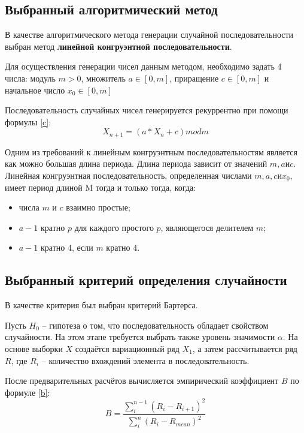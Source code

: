 \subsection*{Выбранный алгоритмический метод}
В качестве алгоритмического метода генерации случайной последовательности выбран метод \textbf{линейной конгруэнтной последовательности}.

Для осуществления генерации чисел данным методом, необходимо задать 4 числа: модуль $m > 0$, множитель $a \in [0, m]$, приращение $c \in [0, m]$ и начальное число $x_0 \in [0, m]$ 

Последовательность случайных чисел генерируется рекуррентно при помощи формулы \ref{c}:
\begin{equation}
	\label{c}
	X_{n + 1} = (a * X_n + c) mod m
\end{equation}

Одним из требований к линейным конгруэнтным последовательностям является как можно большая длина периода. Длина периода зависит от значений $m, a и c$. 
Линейная конгруэнтная последовательность, определенная числами $m, a, c и x_0$, имеет период длиной M тогда и только тогда, когда:
\begin{itemize}
	\item числа $m$ и $c$ взаимно простые;
	\item $a-1$ кратно $p$ для каждого простого $p$, являющегося делителем $m$;
	\item $a-1$ кратно 4, если $m$ кратно 4.
\end{itemize}




\subsection*{Выбранный критерий определения случайности}
В качестве критерия был выбран критерий Бартерса.

Пусть $H_0$ -- гипотеза о том, что последовательность обладает свойством случайности. На этом этапе требуется выбрать также уровень значимости $\alpha$.
На основе выборки $X$ создаётся вариационный ряд $X_1$, а затем рассчитывается ряд $R$, где $R_i$ -- количество вхождений элемента в последовательность.

После предварительных расчётов вычисляется эмпирический коэффициент $B$ по формуле \ref{b}:
\begin{equation}
	\label{b}
	B = \frac{\sum_{i}^{n - 1} (R_i - R_{i + 1})^2}{\sum_{i}^{n} (R_i - R_{mean})^2}
\end{equation}

